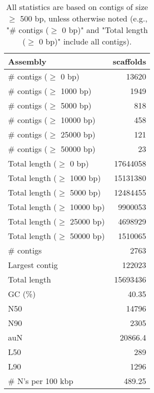 \documentclass[12pt,a4paper]{article}
\begin{document}
\begin{table}[ht]
\begin{center}
\caption{All statistics are based on contigs of size $\geq$ 500 bp, unless otherwise noted (e.g., "\# contigs ($\geq$ 0 bp)" and "Total length ($\geq$ 0 bp)" include all contigs).}
\begin{tabular}{|l*{1}{|r}|}
\hline
Assembly & scaffolds \\ \hline
\# contigs ($\geq$ 0 bp) & 13620 \\ \hline
\# contigs ($\geq$ 1000 bp) & 1949 \\ \hline
\# contigs ($\geq$ 5000 bp) & 818 \\ \hline
\# contigs ($\geq$ 10000 bp) & 458 \\ \hline
\# contigs ($\geq$ 25000 bp) & 121 \\ \hline
\# contigs ($\geq$ 50000 bp) & 23 \\ \hline
Total length ($\geq$ 0 bp) & 17644058 \\ \hline
Total length ($\geq$ 1000 bp) & 15131380 \\ \hline
Total length ($\geq$ 5000 bp) & 12484455 \\ \hline
Total length ($\geq$ 10000 bp) & 9900053 \\ \hline
Total length ($\geq$ 25000 bp) & 4698929 \\ \hline
Total length ($\geq$ 50000 bp) & 1510065 \\ \hline
\# contigs & 2763 \\ \hline
Largest contig & 122023 \\ \hline
Total length & 15693436 \\ \hline
GC (\%) & 40.35 \\ \hline
N50 & 14796 \\ \hline
N90 & 2305 \\ \hline
auN & 20866.4 \\ \hline
L50 & 289 \\ \hline
L90 & 1296 \\ \hline
\# N's per 100 kbp & 489.25 \\ \hline
\end{tabular}
\end{center}
\end{table}
\end{document}
